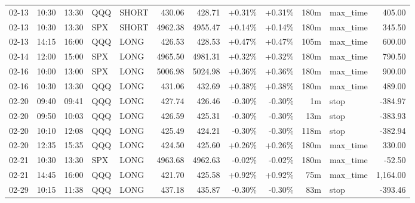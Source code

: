 \documentclass[11pt,a4paper,twoside]{article}
\begin{document}
\begin{center}
\begin{longtable}{>{\color{txtmain}}l l l l l r r r r r >{\color{txtmain}}l r}
02-13 & 10:30 & 13:30 & QQQ & SHORT & 430.06 & 428.71 & \textcolor{wingreen}{+0.31\%} & \textcolor{wingreen}{+0.31\%} & 180m & max\_time & \textcolor{wingreen}{405.00} \\
02-13 & 10:30 & 13:30 & SPX & SHORT & 4962.38 & 4955.47 & \textcolor{wingreen}{+0.14\%} & \textcolor{wingreen}{+0.14\%} & 180m & max\_time & \textcolor{wingreen}{345.50} \\
02-13 & 14:15 & 16:00 & QQQ & LONG & 426.53 & 428.53 & \textcolor{wingreen}{+0.47\%} & \textcolor{wingreen}{+0.47\%} & 105m & max\_time & \textcolor{wingreen}{600.00} \\
02-14 & 12:00 & 15:00 & SPX & LONG & 4965.50 & 4981.31 & \textcolor{wingreen}{+0.32\%} & \textcolor{wingreen}{+0.32\%} & 180m & max\_time & \textcolor{wingreen}{790.50} \\
02-16 & 10:00 & 13:00 & SPX & LONG & 5006.98 & 5024.98 & \textcolor{wingreen}{+0.36\%} & \textcolor{wingreen}{+0.36\%} & 180m & max\_time & \textcolor{wingreen}{900.00} \\
02-16 & 10:30 & 13:30 & QQQ & LONG & 431.06 & 432.69 & \textcolor{wingreen}{+0.38\%} & \textcolor{wingreen}{+0.38\%} & 180m & max\_time & \textcolor{wingreen}{489.00} \\
02-20 & 09:40 & 09:41 & QQQ & LONG & 427.74 & 426.46 & \textcolor{lossred}{-0.30\%} & \textcolor{lossred}{-0.30\%} & 1m & stop & \textcolor{lossred}{-384.97} \\
02-20 & 09:50 & 10:03 & QQQ & LONG & 426.59 & 425.31 & \textcolor{lossred}{-0.30\%} & \textcolor{lossred}{-0.30\%} & 13m & stop & \textcolor{lossred}{-383.93} \\
02-20 & 10:10 & 12:08 & QQQ & LONG & 425.49 & 424.21 & \textcolor{lossred}{-0.30\%} & \textcolor{lossred}{-0.30\%} & 118m & stop & \textcolor{lossred}{-382.94} \\
02-20 & 12:35 & 15:35 & QQQ & LONG & 424.50 & 425.60 & \textcolor{wingreen}{+0.26\%} & \textcolor{wingreen}{+0.26\%} & 180m & max\_time & \textcolor{wingreen}{330.00} \\
02-21 & 10:30 & 13:30 & SPX & LONG & 4963.68 & 4962.63 & \textcolor{lossred}{-0.02\%} & \textcolor{lossred}{-0.02\%} & 180m & max\_time & \textcolor{lossred}{-52.50} \\
02-21 & 14:45 & 16:00 & QQQ & LONG & 421.70 & 425.58 & \textcolor{wingreen}{+0.92\%} & \textcolor{wingreen}{+0.92\%} & 75m & max\_time & \textcolor{wingreen}{1,164.00} \\
02-29 & 10:15 & 11:38 & QQQ & LONG & 437.18 & 435.87 & \textcolor{lossred}{-0.30\%} & \textcolor{lossred}{-0.30\%} & 83m & stop & \textcolor{lossred}{-393.46} \\

\end{longtable}
\end{center}
\end{document}
